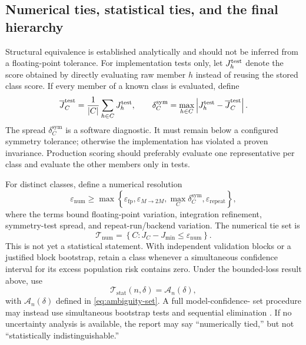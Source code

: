 \documentclass[11pt]{article}
\newcommand{\abs}[1]{\left\lvert #1 \right\rvert}
\newcommand{\set}[1]{\left\{ #1 \right\}}
\begin{document}
    \subsection{Numerical ties, statistical ties, and the final hierarchy}

    Structural equivalence is established analytically and should not be inferred from a
    floating-point tolerance. For implementation tests only, let $J_h^{\rm test}$ denote
    the score obtained by directly evaluating raw member $h$ instead of reusing the stored
    class score. If every member of a known class is evaluated, define
    \begin{equation}
        \overline J_C^{\rm test}=\frac{1}{\abs C}\sum_{h\in C}J_h^{\rm test},
        \qquad
        \delta_C^{\mathrm{sym}}
        =\max_{h\in C}\abs{J_h^{\rm test}-\overline J_C^{\rm test}}.
    \end{equation}
    The spread $\delta_C^{\mathrm{sym}}$ is a software diagnostic. It must remain below a
    configured symmetry tolerance; otherwise the implementation has violated a proven
    invariance. Production scoring should preferably evaluate one representative per class
    and evaluate the other members only in tests.

    For distinct classes, define a numerical resolution
    \begin{equation}
        \varepsilon_{\mathrm{num}}
        \ge
        \max\set{
            \varepsilon_{\mathrm{fp}},
            \varepsilon_{M\rightarrow2M},
            \max_C\delta_C^{\mathrm{sym}},
            \varepsilon_{\mathrm{repeat}}
        },
    \end{equation}
    where the terms bound floating-point variation, integration refinement, symmetry-test
    spread, and repeat-run/backend variation. The numerical tie set is
    \begin{equation}
        \mathcal T_{\mathrm{num}}
        =\set{C:J_C-J_{\min}\le\varepsilon_{\mathrm{num}}}.
    \end{equation}
    This is not yet a statistical statement. With independent validation blocks or a
    justified block bootstrap, retain a class whenever a simultaneous confidence interval
    for its excess population risk contains zero. Under the bounded-loss result above, use
    \begin{equation}
        \mathcal T_{\mathrm{stat}}(n,\delta)
        =\mathcal A_n(\delta),
    \end{equation}
    with $\mathcal A_n(\delta)$ defined in \eqref{eq:ambiguity-set}. A full model-confidence-
    set procedure may instead use simultaneous bootstrap tests and sequential elimination
    \cite{hansen2011}. If no uncertainty analysis is available, the report may say
    ``numerically tied,'' but not ``statistically indistinguishable.''
\end{document}
